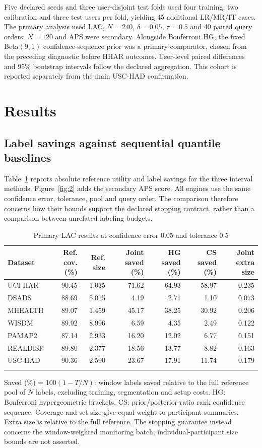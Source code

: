 \documentclass[pdflatex,sn-basic,Numbered,iicol]{sn-jnl}
\begin{document}
Five declared seeds and three user-disjoint test folds used four training, two calibration and three test users per fold, yielding 45 additional LR/MR/IT cases. The primary analysis used LAC, $N=240$, $\delta=0.05$, $\tau=0.5$ and 40 paired query orders; $N=120$ and APS were secondary. Alongside Bonferroni HG, the fixed Beta$(9,1)$ confidence-sequence prior was a primary comparator, chosen from the preceding diagnostic before HHAR outcomes. User-level paired differences and 95\% bootstrap intervals follow the declared aggregation. This cohort is reported separately from the main USC-HAD confirmation.

\section{Results}
\subsection{Label savings against sequential quantile baselines}
Table~\ref{tab:primary} reports absolute reference utility and label savings for the three interval methods. Figure~\ref{fig:2} adds the secondary APS score. All engines use the same confidence error, tolerance, pool and query order. The comparison therefore concerns how their bounds support the declared stopping contract, rather than a comparison between unrelated labeling budgets.

\begin{table}[t]
\centering\small\setlength{\tabcolsep}{3pt}
\caption{Primary LAC results at confidence error 0.05 and tolerance 0.5}\label{tab:primary}
\begin{tabular}{lrrrrrr}
\toprule
Dataset & Ref. cov. (\%) & Ref. size & Joint saved (\%) & HG saved (\%) & CS saved (\%) & Joint extra size \\
\midrule
UCI HAR & 90.45 & 1.035 & 71.62 & 64.93 & 58.97 & 0.235 \\
DSADS & 88.69 & 5.015 & 4.19 & 2.71 & 1.10 & 0.073 \\
MHEALTH & 89.07 & 1.459 & 45.17 & 38.25 & 30.92 & 0.206 \\
WISDM & 89.92 & 8.996 & 6.59 & 4.35 & 2.49 & 0.122 \\
PAMAP2 & 87.14 & 2.933 & 16.20 & 12.02 & 6.77 & 0.151 \\
REALDISP & 89.80 & 2.377 & 18.56 & 13.77 & 8.82 & 0.163 \\
USC-HAD & 90.36 & 2.590 & 23.67 & 17.91 & 11.74 & 0.179 \\
\botrule
\end{tabular}
\begin{minipage}{\textwidth}\footnotesize Saved (\%) = $100(1-T/N)$: window labels saved relative to the full reference pool of $N$ labels, excluding training, segmentation and setup costs. HG: Bonferroni hypergeometric brackets. CS: prior/posterior-ratio rank confidence sequence. Coverage and set size give equal weight to participant summaries. Extra size is relative to the full reference. The stopping guarantee instead concerns the window-weighted monitoring batch; individual-participant size bounds are not asserted.\end{minipage}
\end{table}
\end{document}
